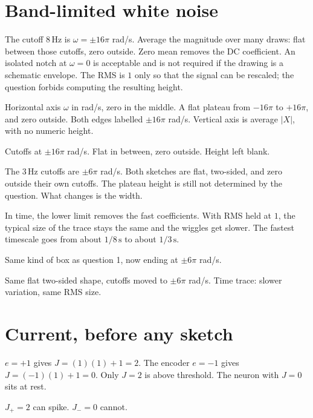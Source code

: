 \documentclass[11pt,letterpaper]{article}
\newcommand{\ans}[1]{\par\vspace{2pt}{\bfseries #1}\quad}
\begin{document}
\section{Band-limited white noise}

\ans{1.}
The cutoff $8\,\mathrm{Hz}$ is $\omega = \pm 16\pi$ rad/s. Average the magnitude over many draws: flat between those cutoffs, zero outside. Zero mean removes the DC coefficient. An isolated notch at $\omega = 0$ is acceptable and is not required if the drawing is a schematic envelope. The RMS is $1$ only so that the signal can be rescaled; the question forbids computing the resulting height.
\begin{sketch}
Horizontal axis $\omega$ in rad/s, zero in the middle. A flat plateau from $-16\pi$ to $+16\pi$, and zero outside. Both edges labelled $\pm 16\pi$ rad/s. Vertical axis is average $|X|$, with no numeric height.
\end{sketch}
\begin{result}
Cutoffs at $\pm 16\pi$ rad/s. Flat in between, zero outside. Height left blank.
\end{result}

\ans{2.}
The $3\,\mathrm{Hz}$ cutoffs are $\pm 6\pi$ rad/s. Both sketches are flat, two-sided, and zero outside their own cutoffs. The plateau height is still not determined by the question. What changes is the width.

In time, the lower limit removes the fast coefficients. With RMS held at $1$, the typical size of the trace stays the same and the wiggles get slower. The fastest timescale goes from about $1/8\,\mathrm{s}$ to about $1/3\,\mathrm{s}$.
\begin{sketch}
Same kind of box as question 1, now ending at $\pm 6\pi$ rad/s.
\end{sketch}
\begin{result}
Same flat two-sided shape, cutoffs moved to $\pm 6\pi$ rad/s. Time trace: slower variation, same RMS size.
\end{result}

\section{Current, before any sketch}

\ans{1.}
$e = +1$ gives $J = (1)(1) + 1 = 2$. The encoder $e = -1$ gives $J = (-1)(1) + 1 = 0$. Only $J = 2$ is above threshold. The neuron with $J = 0$ sits at rest.
\begin{result}
$J_+ = 2$ can spike. $J_- = 0$ cannot.
\end{result}
\end{document}
